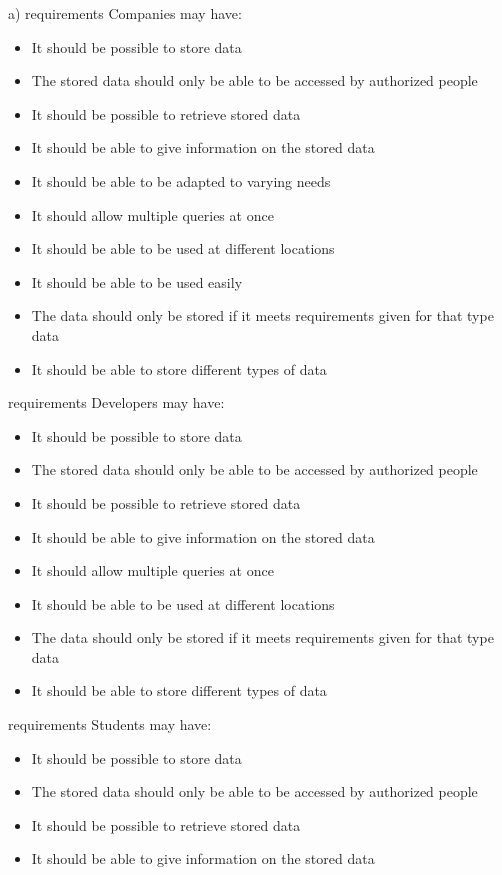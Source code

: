 \begin{elenco}
\item 
a) 
requirements Companies may have:
\begin{itemize}
    \item It should be possible to store data
    \item The stored data should only be able to be accessed by authorized people
    \item It should be possible to retrieve stored data
    \item It should be able to give information on the stored data
    \item It should be able to be adapted to varying needs
    \item It should allow multiple queries at once
    \item It should be able to be used at different locations
    \item It should be able to be used easily
    \item The data should only be stored if it meets requirements given for that type data
    \item It should be able to store different types of data
\end{itemize} 
requirements Developers may have:
\begin{itemize}
    \item It should be possible to store data
    \item The stored data should only be able to be accessed by authorized people
    \item It should be possible to retrieve stored data
    \item It should be able to give information on the stored data
    \item It should allow multiple queries at once
    \item It should be able to be used at different locations
    \item The data should only be stored if it meets requirements given for that type data
    \item It should be able to store different types of data
\end{itemize}
requirements Students may have:
\begin{itemize}
    \item It should be possible to store data
    \item The stored data should only be able to be accessed by authorized people
    \item It should be possible to retrieve stored data
    \item It should be able to give information on the stored data

\end{itemize}
\end{elenco}
